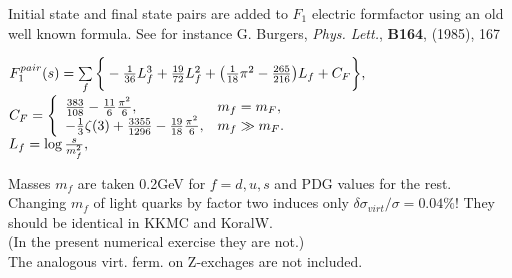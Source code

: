 \documentclass[dvips,portrait]{seminar}             %
\begin{document}
\begin{slide*}                                                %

{\small\color{blue}
Initial state and final state pairs are added to $F_1$ electric
formfactor using an old well known formula.
{\tiny See for instance G. Burgers, {\it Phys. Lett.}, {\bf B164}, (1985), {167}}
}

{\small
$F_1^{pair}(s)= \sum\limits_f \bigg\{
     -{1\over36} L_f^3 +{19\over72}L_f^2 
     +\big({1\over18}\pi^2-{265\over216}\big)L_f +C_F \bigg\} ,$\\
$C_F= \left\{ \begin{array}{ll}
      {383\over108} -{11\over6}{\pi^2\over6},                      & m_f  =m_F, \\
      -{1\over3}\zeta(3)+{3355\over1296} -{19\over18}{\pi^2\over6},& m_f \gg m_F.
           \end{array} \right.$\\
$L_f= \log{s\over m_f^2},$
}

{\small\color{blue}
Masses $m_f$ are taken 0.2GeV for $f=d,u,s$ and PDG values for the rest.
Changing $m_f$ of light quarks by factor two induces 
only $\delta\sigma_{virt}/\sigma=0.04\%$!
They should be identical in KKMC and KoralW.\\
(In the present numerical exercise they are not.)\\
The analogous virt. ferm. on Z-exchages are not included.
}


\vfill
\end{slide*}   %
\end{document}
